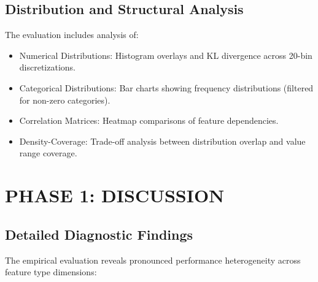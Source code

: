 \documentclass[10pt,conference,a4paper]{IEEEtran}
\begin{document}
\begin{table}[htbp]
\centering
\caption{Jensen-Shannon Divergence per Categorical Feature (Generation of Realistic Tabular data (GReaT))}
\label{tab:jsd_great}
\end{table}

\subsection{Distribution and Structural Analysis}
The evaluation includes analysis of:
\begin{itemize}
    \item Numerical Distributions: Histogram overlays and KL divergence across 20-bin discretizations.
    \item Categorical Distributions: Bar charts showing frequency distributions (filtered for non-zero categories).
    \item Correlation Matrices: Heatmap comparisons of feature dependencies.
    \item Density-Coverage: Trade-off analysis between distribution overlap and value range coverage.
\end{itemize}

\section{PHASE 1: DISCUSSION}

\subsection{Detailed Diagnostic Findings}
The empirical evaluation reveals pronounced performance heterogeneity across feature type dimensions:
\end{document}
